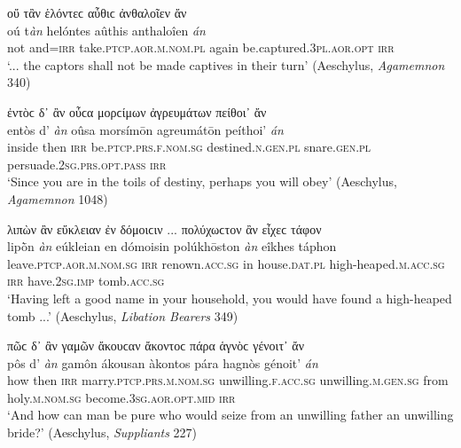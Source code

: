 \begin{exe}
\ex οὔ τἂν ἑλόντεϲ αὖθιϲ ἀνθαλοῖεν ἄν\\
\gll oú t\emph{àn} helóntes aûthis anthaloîen \emph{án}\\
not and=\textsc{irr} take.\textsc{ptcp.aor.m.nom.pl} again be.captured.\textsc{3pl.aor.opt} \textsc{irr}\\
\trans `... the captors shall not be made captives in their turn' (Aeschylus, \textit{Agamemnon} 340)
\label{multian1}
\end{exe}

\begin{exe}
\ex ἐντὸϲ δ᾽ ἂν οὖϲα μορϲίμων ἀγρευμάτων πείθοι᾽ ἄν\\
\gll entòs d' \emph{àn} oûsa morsímōn agreumátōn peíthoi' \emph{án}\\
inside then \textsc{irr} be.\textsc{ptcp.prs.f.nom.sg} destined.\textsc{n.gen.pl} snare.\textsc{gen.pl} persuade.\textsc{2sg.prs.opt.pass} \textsc{irr}\\
\trans `Since you are in the toils of destiny, perhaps you will obey' (Aeschylus, \textit{Agamemnon} 1048)
\label{multian2}
\end{exe}

\begin{exe}
\ex λιπὼν ἂν εὔκλειαν ἐν δόμοιϲιν ... πολύχωϲτον ἂν εἶχεϲ τάφον\\
\gll lipṑn \emph{àn} eúkleian en dómoisin polúkhōston \emph{àn} eîkhes táphon\\
leave.\textsc{ptcp.aor.m.nom.sg} \textsc{irr} renown.\textsc{acc.sg} in house.\textsc{dat.pl} high-heaped.\textsc{m.acc.sg} \textsc{irr} have.\textsc{2sg.imp} tomb.\textsc{acc.sg}\\
\trans `Having left a good name in your household, you would have found a high-heaped tomb ...' (Aeschylus, \textit{Libation Bearers} 349)
\label{multian3}
\end{exe}

\begin{exe}
\ex πῶϲ δ᾽ ἂν γαμῶν ἄκουϲαν ἄκοντοϲ πάρα ἁγνὸϲ γένοιτ᾽ ἄν\\
\gll pôs d' \emph{àn} gamôn ákousan àkontos pára hagnòs génoit' \emph{án}\\
how then \textsc{irr} marry.\textsc{ptcp.prs.m.nom.sg} unwilling.\textsc{f.acc.sg} unwilling.\textsc{m.gen.sg} from holy.\textsc{m.nom.sg} become.\textsc{3sg.aor.opt.mid} \textsc{irr}\\
\trans `And how can man be pure who would seize from an unwilling father an unwilling bride?' (Aeschylus, \textit{Suppliants} 227)
\label{multian4}
\end{exe}

